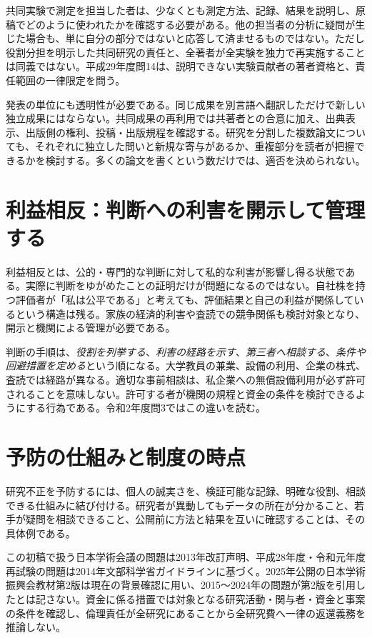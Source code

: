 共同実験で測定を担当した者は、少なくとも測定方法、記録、結果を説明し、原稿でどのように使われたかを確認する必要がある。他の担当者の分析に疑問が生じた場合も、単に自分の部分ではないと応答して済ませるものではない。ただし役割分担を明示した共同研究の責任と、全著者が全実験を独力で再実施することは同義ではない。平成29年度問14は、説明できない実験貢献者の著者資格と、責任範囲の一律限定を問う。

発表の単位にも透明性が必要である。同じ成果を別言語へ翻訳しただけで新しい独立成果にはならない。共同成果の再利用では共著者との合意に加え、出典表示、出版側の権利、投稿・出版規程を確認する。研究を分割した複数論文についても、それぞれに独立した問いと新規な寄与があるか、重複部分を読者が把握できるかを検討する。多くの論文を書くという数だけでは、適否を決められない。

\section{利益相反：判断への利害を開示して管理する}
\label{theory:research:coi}
利益相反とは、公的・専門的な判断に対して私的な利害が影響し得る状態である。実際に判断をゆがめたことの証明だけが問題になるのではない。自社株を持つ評価者が「私は公平である」と考えても、評価結果と自己の利益が関係しているという構造は残る。家族の経済的利害や査読での競争関係も検討対象となり、開示と機関による管理が必要である\parencite{jsps_integrity2025}。

判断の手順は、\emph{役割を列挙する}、\emph{利害の経路を示す}、\emph{第三者へ相談する}、\emph{条件や回避措置を定める}という順になる。大学教員の兼業、設備の利用、企業の株式、査読では経路が異なる。適切な事前相談は、私企業への無償設備利用が必ず許可されることを意味しない。許可する者が機関の規程と資金の条件を検討できるようにする行為である。令和2年度問3ではこの違いを読む。

\section{予防の仕組みと制度の時点}
\label{theory:research:prevention}
研究不正を予防するには、個人の誠実さを、検証可能な記録、明確な役割、相談できる仕組みに結び付ける。研究者が異動してもデータの所在が分かること、若手が疑問を相談できること、公開前に方法と結果を互いに確認することは、その具体例である。

\begin{tcolorbox}[title=出題資料と現在の参照資料]
この初稿で扱う日本学術会議の問題は2013年改訂声明、平成28年度・令和元年度再試験の問題は2014年文部科学省ガイドラインに基づく。2025年公開の日本学術振興会教材第2版は現在の背景確認に用い、2015〜2024年の問題が第2版を引用したとは記さない。資金に係る措置では対象となる研究活動・関与者・資金と事案の条件を確認し、倫理責任が全研究にあることから全研究費へ一律の返還義務を推論しない。
\end{tcolorbox}

